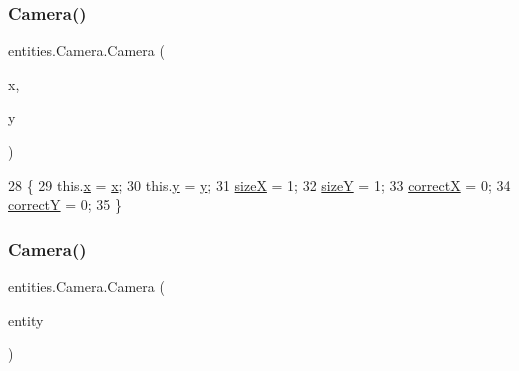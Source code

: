 \subsubsection{\texorpdfstring{Camera()}{Camera()}\hspace{0.1cm}{\footnotesize\ttfamily [1/2]}}
{\footnotesize\ttfamily entities.\+Camera.\+Camera (\begin{DoxyParamCaption}\item[{int}]{x,  }\item[{int}]{y }\end{DoxyParamCaption})\hspace{0.3cm}{\ttfamily [inline]}}


\begin{DoxyCode}
28                                 \{
29         this.\mbox{\hyperlink{classentities_1_1_camera_a66b52dbb998f7f0a8f0a191d9bf7d35e}{x}} = \mbox{\hyperlink{classentities_1_1_camera_a66b52dbb998f7f0a8f0a191d9bf7d35e}{x}};
30         this.\mbox{\hyperlink{classentities_1_1_camera_ab37210b8774bf7d2210ab91bd1656e68}{y}} = \mbox{\hyperlink{classentities_1_1_camera_ab37210b8774bf7d2210ab91bd1656e68}{y}};
31         \mbox{\hyperlink{classentities_1_1_camera_aa5e6560668484615713b725a6e1c33b8}{sizeX}} = 1;
32         \mbox{\hyperlink{classentities_1_1_camera_a57263eec54d4e2aaee3c60a9591182cf}{sizeY}} = 1;
33         \mbox{\hyperlink{classentities_1_1_camera_aff3fca00a4578d5a45ddb9c402d1bf0e}{correctX}} = 0;
34         \mbox{\hyperlink{classentities_1_1_camera_a4e9aeca687823695b7f8bd5842d063fc}{correctY}} = 0;
35     \}
\end{DoxyCode}
\mbox{\label{classentities_1_1_camera_a36acc56a0a5627c07779da8116145f50}} 
\subsubsection{\texorpdfstring{Camera()}{Camera()}\hspace{0.1cm}{\footnotesize\ttfamily [2/2]}}
{\footnotesize\ttfamily entities.\+Camera.\+Camera (\begin{DoxyParamCaption}\item[{\mbox{\hyperlink{classentities_1_1_mobile_entity}{Mobile\+Entity}}}]{entity }\end{DoxyParamCaption})\hspace{0.3cm}{\ttfamily [inline]}}


